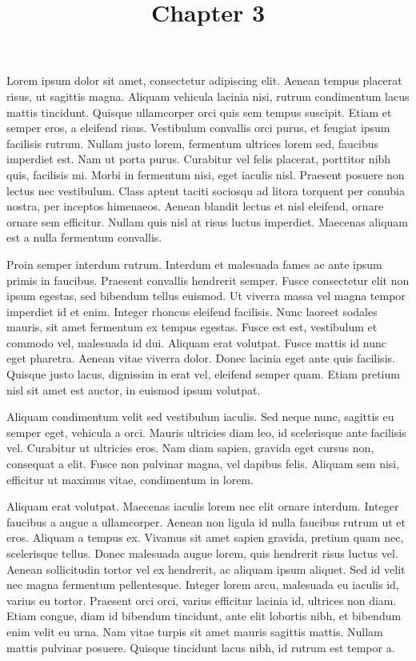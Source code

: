 \documentclass{article}
\begin{document}
\title{Chapter 3}

\maketitle


Lorem ipsum dolor sit amet, consectetur adipiscing elit. Aenean tempus placerat risus, ut sagittis magna. Aliquam vehicula lacinia nisi, rutrum condimentum lacus mattis tincidunt. Quisque ullamcorper orci quis sem tempus suscipit. Etiam et semper eros, a eleifend risus. Vestibulum convallis orci purus, et feugiat ipsum facilisis rutrum. Nullam justo lorem, fermentum ultrices lorem sed, faucibus imperdiet est. Nam ut porta purus. Curabitur vel felis placerat, porttitor nibh quis, facilisis mi. Morbi in fermentum nisi, eget iaculis nisl. Praesent posuere non lectus nec vestibulum. Class aptent taciti sociosqu ad litora torquent per conubia nostra, per inceptos himenaeos. Aenean blandit lectus et nisl eleifend, ornare ornare sem efficitur. Nullam quis nisl at risus luctus imperdiet. Maecenas aliquam est a nulla fermentum convallis.


Proin semper interdum rutrum. Interdum et malesuada fames ac ante ipsum primis in faucibus. Praesent convallis hendrerit semper. Fusce consectetur elit non ipsum egestas, sed bibendum tellus euismod. Ut viverra massa vel magna tempor imperdiet id et enim. Integer rhoncus eleifend facilisis. Nunc laoreet sodales mauris, sit amet fermentum ex tempus egestas. Fusce est est, vestibulum et commodo vel, malesuada id dui. Aliquam erat volutpat. Fusce mattis id nunc eget pharetra. Aenean vitae viverra dolor. Donec lacinia eget ante quis facilisis. Quisque justo lacus, dignissim in erat vel, eleifend semper quam. Etiam pretium nisl sit amet est auctor, in euismod ipsum volutpat.


Aliquam condimentum velit sed vestibulum iaculis. Sed neque nunc, sagittis eu semper eget, vehicula a orci. Mauris ultricies diam leo, id scelerisque ante facilisis vel. Curabitur ut ultricies eros. Nam diam sapien, gravida eget cursus non, consequat a elit. Fusce non pulvinar magna, vel dapibus felis. Aliquam sem nisi, efficitur ut maximus vitae, condimentum in lorem.


Aliquam erat volutpat. Maecenas iaculis lorem nec elit ornare interdum. Integer faucibus a augue a ullamcorper. Aenean non ligula id nulla faucibus rutrum ut et eros. Aliquam a tempus ex. Vivamus sit amet sapien gravida, pretium quam nec, scelerisque tellus. Donec malesuada augue lorem, quis hendrerit risus luctus vel. Aenean sollicitudin tortor vel ex hendrerit, ac aliquam ipsum aliquet. Sed id velit nec magna fermentum pellentesque. Integer lorem arcu, malesuada eu iaculis id, varius eu tortor. Praesent orci orci, varius efficitur lacinia id, ultrices non diam. Etiam congue, diam id bibendum tincidunt, ante elit lobortis nibh, et bibendum enim velit eu urna. Nam vitae turpis sit amet mauris sagittis mattis. Nullam mattis pulvinar posuere. Quisque tincidunt lacus nibh, id rutrum est tempor a.
\end{document}
